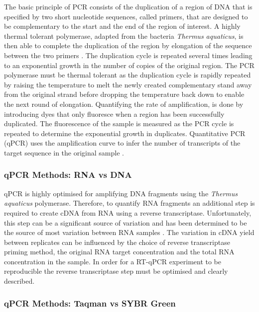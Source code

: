 \documentclass[../main.tex]{subfiles}
\begin{document}
The basic principle of PCR consists of the duplication of a region of DNA that is specified by two short nucleotide sequences, called primers, that are designed to be complementary to the start and the end of the region of interest. 
A highly thermal tolerant polymerase, adapted from the bacteria \textit{Thermus aquaticus}, is then able to complete the duplication of the region by elongation of the sequence between the two primers \parencite{Saiki1988}.
The duplication cycle is repeated several times leading to an exponential growth in the number of copies of the original region.
The PCR polymerase must be thermal tolerant as the duplication cycle is rapidly repeated by raising the temperature to melt the newly created complementary stand away from the original strand before dropping the temperature back down to enable the next round of elongation. 
Quantifying the rate of amplification, is done by introducing dyes that only fluoresce when a region has been successfully duplicated. 
The fluorescence of the sample is measured as the PCR cycle is repeated to determine the exponential growth in duplicates.
Quantitative PCR (qPCR) uses the amplification curve to infer the number of transcripts of the target sequence in the original sample \parencite{Holland1991}.

\subsubsection{qPCR Methods: RNA vs DNA}

qPCR is highly optimised for amplifying DNA fragments using the \textit{Thermus aquaticus} polymerase. 
Therefore, to quantify RNA fragments an additional step is required to create cDNA from RNA using a reverse transcriptase. 
Unfortunately, this step can be a significant source of variation and has been determined to be the source of most variation between RNA samples \parencite{Stahlberg2004}. 
The variation in cDNA yield between replicates can be influenced by the choice of reverse transcriptase priming method, the original RNA target concentration and the total RNA concentration in the sample. 
In order for a RT-qPCR experiment to be reproducible the reverse transcriptase step must be optimised and clearly described. 

\subsubsection{qPCR Methods: Taqman vs SYBR Green}

\end{document}
